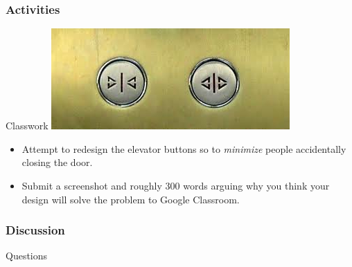 \documentclass{beamer}
\begin{document}
\begin{frame}
	\frametitle{Activities}
	\begin{block}{Classwork}
	\centering
	\includegraphics[width=.5\linewidth]{elevator_bt}
	\begin{itemize}
		\item Attempt to redesign the elevator buttons so to \textit{minimize} people accidentally closing the door.
		\item Submit a screenshot and roughly 300 words arguing why you think your design will solve the problem to Google Classroom. 
	\end{itemize}
	\end{block}
\end{frame}

\begin{frame}
	\frametitle{Discussion}
\end{frame}


\begin{frame}
\Huge{\centerline{Questions}}
\end{frame}

\end{document}
